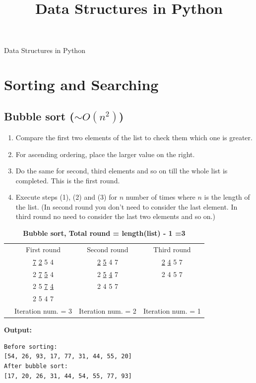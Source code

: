 \documentclass[12pt]{article}
\begin{document}
\title{Data Structures in Python}
\begin{center}
	\huge {Data Structures in Python}
\end{center}

\section{Sorting and Searching}
\subsection{Bubble sort ($\sim O(n^2)$)}
\begin{enumerate}
	\item Compare the first two elements of the list to check them which one is greater.
	\item For ascending ordering, place the larger value on the right.
	\item Do the same for second, third elements and so on till the whole list is completed. This is the first round.
	\item Execute steps (1), (2) and (3) for $n$ number of times where $n$ is the length of the list. (In second round you don't need to consider the last element. In third round no need to consider the last two elements and so on.)
\end{enumerate}
\begin{table}[h]
	\label{Bubble sort}
	\caption{\textbf{Bubble sort, Total round = length(list) - 1 =3}}
	\vspace{2mm}
	\centering
	\begin{tabular}{cccc}
		&{First round}  &{Second round}  &{Third round}   \\
		&\underline{7} \underline{2} 5 4  &\underline{2} \underline{5} 4 7&\underline{2} \underline{4} 5 7\\
		
		&2 \underline{7} \underline{5} 4&2 \underline{5} \underline{4} 7  &2 4 5 7   \\
		&2 5 \underline{7} \underline{4}  &2 4 5 7 &   \\
		&2 5 4 7  & &\\
		&Iteration num. = 3 &Iteration num. = 2 &Iteration num. = 1 
	\end{tabular}
\end{table}


\textbf{Output:}
\begin{lstlisting}
Before sorting:
[54, 26, 93, 17, 77, 31, 44, 55, 20]
After bubble sort:
[17, 20, 26, 31, 44, 54, 55, 77, 93]
\end{lstlisting}
\end{document}
